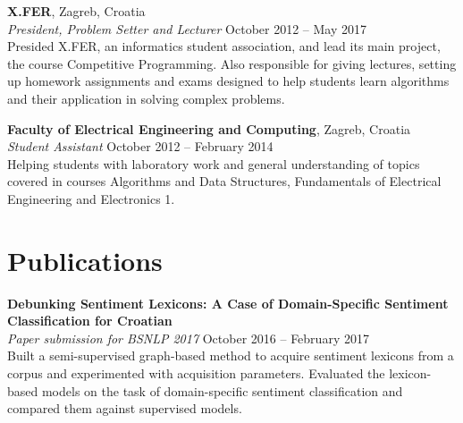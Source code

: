\documentclass[margin,line]{resume}
\begin{document}
\begin{resume}
\textbf{X.FER}, Zagreb, Croatia \vspace{1mm}\\\vspace{1mm}%
\textsl{President, Problem Setter and Lecturer} \hfill October 2012 -- May 2017\\%
Presided X.FER, an informatics student association, and lead its main project, the course Competitive Programming. Also responsible for giving lectures, setting up homework assignments and exams designed to help students learn algorithms and their application in solving complex problems.


\textbf{Faculty of Electrical Engineering and Computing}, Zagreb, Croatia \vspace{1mm}\\\vspace{1mm}%
\textsl{Student Assistant} \hfill October 2012 -- February 2014\\%
Helping students with laboratory work and general understanding of topics covered in courses Algorithms  and  Data  Structures, Fundamentals  of  Electrical  Engineering and  Electronics 1.



\vspace{1mm}
\section{\mysidestyle Publications}

\textbf{Debunking Sentiment Lexicons: A Case of Domain-Specific Sentiment Classification for Croatian} \vspace{1mm}\\\vspace{1mm}%
\textsl{Paper submission for BSNLP 2017} \hfill October 2016 -- February 2017\\%
Built a semi-supervised graph-based method to acquire sentiment lexicons from a corpus and experimented with acquisition parameters. Evaluated the lexicon-based models on the task of domain-specific sentiment classification and compared them against supervised models.


\end{resume}
\end{document}
